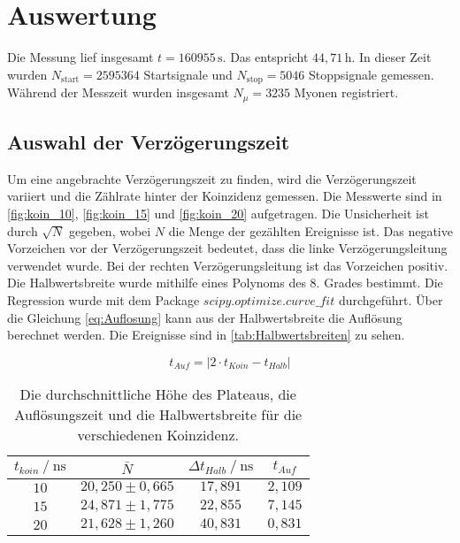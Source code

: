 \section{Auswertung}
\label{sec:auswertung}


Die Messung lief insgesamt $t = 160955 \, \unit{\second}$. Das entspricht $44,71 \, \unit{\hour}$. In dieser Zeit wurden $N_\text{start} = 2595364$ Startsignale und $N_\text{stop} = 5046$ Stoppsignale gemessen.
Während der Messzeit wurden insgesamt $N_{\mu} = 3235 $ Myonen registriert.

\subsection{Auswahl der Verzögerungszeit}
\label{sec:Verzögerungszeit}
Um eine angebrachte Verzögerungszeit zu finden, wird die Verzögerungszeit variiert und die Zählrate hinter der Koinzidenz gemessen.
Die Messwerte sind in \autoref{fig:koin_10}, \autoref{fig:koin_15} und \autoref{fig:koin_20} aufgetragen. Die Unsicherheit ist durch $ \sqrt{N}$ gegeben, wobei $N$ die Menge der gezählten Ereignisse ist.
Das negative Vorzeichen vor der Verzögerungszeit bedeutet, dass die linke Verzögerungsleitung verwendet wurde. Bei der rechten Verzögerungsleitung ist das Vorzeichen positiv.
Die Halbwertsbreite wurde mithilfe eines Polynoms des 8. Grades bestimmt. Die Regression wurde mit dem Package $scipy.optimize.curve\_ fit $  \cite{scipyop} durchgeführt.
Über die Gleichung \eqref{eq:Auflosung} kann aus der Halbwertsbreite die Auflösung berechnet werden. Die Ereignisse sind in \autoref{tab:Halbwertsbreiten} zu sehen.

\begin{equation}
    t_{Auf} = \left|2 \cdot t_{Koin} - t_{Halb} \right|
    \label{eq:Auflosung}
\end{equation}

\begin{table}[H]
    \centering
    \caption{Die durchschnittliche Höhe des Plateaus, die Auflösungszeit und die Halbwertsbreite für die verschiedenen Koinzidenz.}
    \label{tab:Halbwertsbreiten}
    \begin{tabular}{c c c c}
    \toprule
     $t_{koin} \mathbin{/} \unit{\nano\second} $ &$\bar{N}$ & $\Delta t_{Halb} \mathbin{/} \unit{\nano\second}$ & $t_{Auf}$ \\
    \midrule
        $10$&  $20,250 \pm 0,665$ &  $17,891$ & $2,109$\\
        $15$&  $24,871 \pm 1,775$ &  $22,855$ & $7,145$\\
        $20$&  $21,628 \pm 1,260$ &  $40,831$ & $0,831$\\
    \bottomrule
    \end{tabular}
    \end{table}

